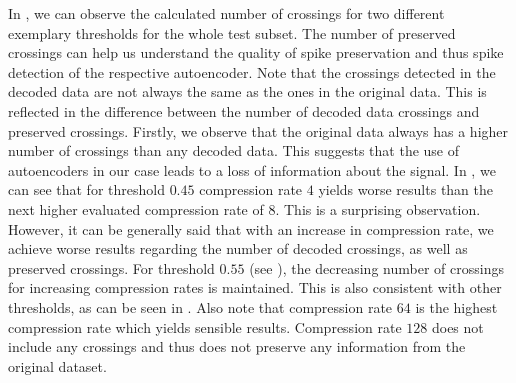 In , we can observe the calculated number of crossings for two different exemplary thresholds for the whole test subset.
The number of preserved crossings can help us understand the quality of spike preservation and thus spike detection of the respective autoencoder.
Note that the crossings detected in the decoded data are not always the same as the ones in the original data. 
This is reflected in the difference between the number of decoded data crossings and preserved crossings.
Firstly, we observe that the original data always has a higher number of crossings than any decoded data. 
This suggests that the use of autoencoders in our case leads to a loss of information about the signal.
In , we can see that for threshold $0.45$ compression rate $4$ yields worse results than the next higher evaluated compression rate of $8$.
This is a surprising observation.
However, it can be generally said that with an increase in compression rate, we achieve worse results regarding the number of decoded crossings, as well as preserved crossings.
For threshold $0.55$ (see ), the decreasing number of crossings for increasing compression rates is maintained.
This is also consistent with other thresholds, as can be seen in .
Also note that compression rate $64$ is the highest compression rate which yields sensible results.
Compression rate $128$ does not include any crossings and thus does not preserve any information from the original dataset.

